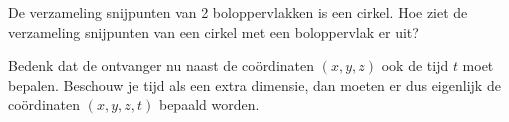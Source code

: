 \begin{Hint}{4.9}
		De verzameling snijpunten van 2 boloppervlakken is een cirkel. Hoe ziet de verzameling snijpunten van een cirkel met een boloppervlak er uit?
	
\end{Hint}
\begin{Hint}{4.15}
		Bedenk dat de ontvanger nu naast de co\"ordinaten $(x, y, z)$ ook de tijd $t$ moet bepalen. Beschouw je tijd als een extra dimensie, dan moeten er dus eigenlijk de co\"ordinaten $(x, y, z, t)$ bepaald worden.
	
\end{Hint}
